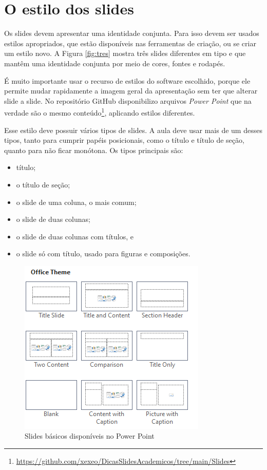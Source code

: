 \section{O estilo dos slides}

Os slides devem apresentar uma identidade conjunta. Para isso devem ser usados estilos apropriados, que estão disponíveis nas ferramentas de criação, ou se criar um estilo novo. A Figura \ref{fig:tres} mostra três slides diferentes em tipo e que mantêm uma identidade conjunta por meio de cores, fontes e rodapés.

É muito importante usar o recurso de estilos do software escolhido, porque ele permite mudar rapidamente a imagem geral da apresentação sem ter que alterar slide a slide. No repositório GitHub disponibilizo  arquivos \textit{Power Point} que na verdade são o mesmo conteúdo\footnote{\url{https://github.com/xexeo/DicasSlidesAcademicos/tree/main/Slides}}, aplicando estilos diferentes.

Esse estilo deve possuir vários tipos de slides. A aula deve usar mais de um desses tipos, tanto para cumprir papéis posicionais, como o título e título de seção, quanto para não ficar monótona. Os tipos principais são:
\begin{itemize}
    \item título;
    \item o título de seção;
    \item o slide de uma coluna, o mais comum;
    \item o slide de duas colunas;
    \item o slide de duas colunas com títulos, e
    \item o slide só com título, usado para figuras e composições.
\end{itemize}




\begin{figure}[htb]
    \centering
    \includegraphics[width=0.5\linewidth]{imagens/tiposbasicosdopp}
    \caption{Slides básicos disponíveis no Power Point}
    \label{fig:tiposbasicosdopp}
\end{figure}

